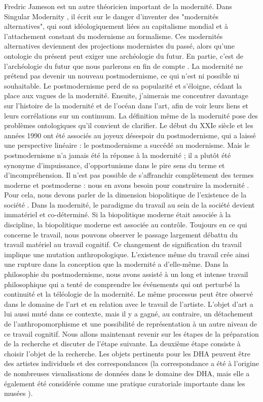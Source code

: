 \documentclass[a4paper, twoside, 12pt]{book}
\begin{document}
Fredric Jameson est un autre théoricien important de la modernité. Dans Singular Modernity , il écrit sur le danger d'inventer des "modernités alternatives", qui sont idéologiquement liées au capitalisme mondial et à l'attachement constant du modernisme au formalisme. Ces modernités alternatives deviennent des projections modernistes du passé, alors qu'une ontologie du présent peut exiger une archéologie du futur. En partie, c'est de l'archéologie du futur que nous parlerons en fin de compte . 
La modernité ne prétend pas devenir un nouveau postmodernisme, ce qui n'est ni possible ni souhaitable. Le postmodernisme perd de sa popularité et s'éloigne, cédant la place aux vagues de la modernité.  Ensuite, j'aimerais me concentrer davantage sur l'histoire de la modernité et de l'océan dans l'art, afin de voir leurs liens et leurs corrélations sur un continuum. 
La définition même de la modernité pose des problèmes ontologiques qu'il convient de clarifier. Le début du XXIe siècle et les années 1990 ont été associés au joyeux désespoir du postmodernisme, qui a laissé une perspective linéaire : le postmodernisme a succédé au modernisme. Mais le postmodernisme n'a jamais été la réponse à la modernité ; il a plutôt été synonyme d'impuissance, d'opportunisme dans le pire sens du terme et d'incompréhension. Il n'est pas possible de s'affranchir complètement des termes moderne et postmoderne : nous en avons besoin pour construire la modernité . 
Pour cela, nous devons parler de la dimension biopolitique de l'existence de la société . Dans la modernité, le paradigme du travail au sein de la société devient immatériel et co-déterminé. Si la biopolitique moderne était associée à la discipline, la biopolitique moderne est associée au contrôle. Toujours en ce qui concerne le travail, nous pouvons observer le passage largement débattu du travail matériel au travail cognitif. Ce changement de signification du travail implique une mutation anthropologique. L'existence même du travail crée ainsi une rupture dans la conception que la modernité a d'elle-même. Dans la philosophie du postmodernisme, nous avons assisté à un long et intense travail philosophique qui a tenté de comprendre les événements qui ont perturbé la continuité et la téléologie de la modernité. Le même processus peut être observé dans le domaine de l'art et en relation avec le travail de l'artiste. L'objet d'art a lui aussi muté dans ce contexte, mais il y a gagné, au contraire, un détachement de l'anthropomorphisme et une possibilité de représentation à un autre niveau de ce travail cognitif. Nous allons maintenant revenir sur les étapes de la préparation de la recherche et discuter de l'étape suivante. 
La deuxième étape consiste à choisir l'objet de la recherche. Les objets pertinents pour les DHA peuvent être des artistes individuels et des correspondances (la correspondance a été à l'origine de nombreuses visualisations de données dans le domaine des DHA, mais elle a également été considérée comme une pratique curatoriale importante dans les musées ). 
\end{document}

